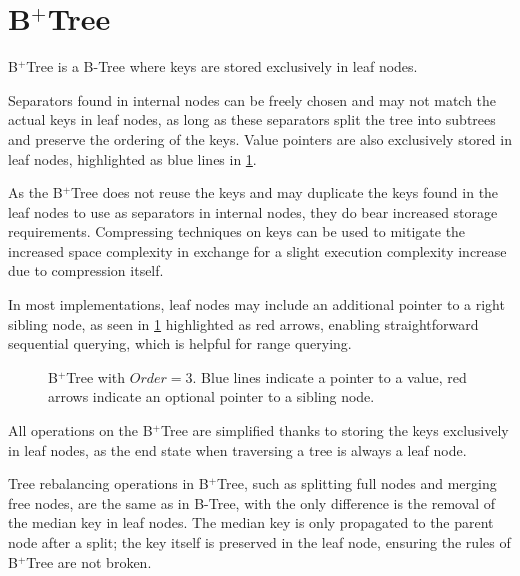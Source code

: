 \section{B$^+$Tree}

\begin{definition}
  B$^+$Tree is a B-Tree where keys are stored exclusively in leaf nodes.
\end{definition}

Separators found in internal nodes can be freely chosen and may not match the actual keys in leaf nodes, as long as these separators split the tree into subtrees and preserve the ordering of the keys. Value pointers are also exclusively stored in leaf nodes, highlighted as blue lines in \cref{figure:b-plus-tree}.

As the B$^+$Tree does not reuse the keys and may duplicate the keys found in the leaf nodes to use as separators in internal nodes, they do bear increased storage requirements. Compressing techniques on keys can be used to mitigate the increased space complexity in exchange for a slight execution complexity increase due to compression itself.

In most implementations, leaf nodes may include an additional pointer to a right sibling node, as seen in \cref{figure:b-plus-tree} highlighted as red arrows, enabling straightforward sequential querying, which is helpful for range querying. 

\begin{figure}
  \centering
  
  \caption[B$^+$Tree with $\mathit{Order} = 3$.]{B$^+$Tree with $\mathit{Order} = 3$. Blue lines indicate a pointer to a value, red arrows indicate an optional pointer to a sibling node.}
  \label{figure:b-plus-tree}
\end{figure}

All operations on the B$^+$Tree are simplified thanks to storing the keys exclusively in leaf nodes, as the end state when traversing a tree is always a leaf node.

Tree rebalancing operations in B$^+$Tree, such as splitting full nodes and merging free nodes, are the same as in B-Tree, with the only difference is the removal of the median key in leaf nodes. The median key is only propagated to the parent node after a split; the key itself is preserved in the leaf node, ensuring the rules of B$^+$Tree are not broken.